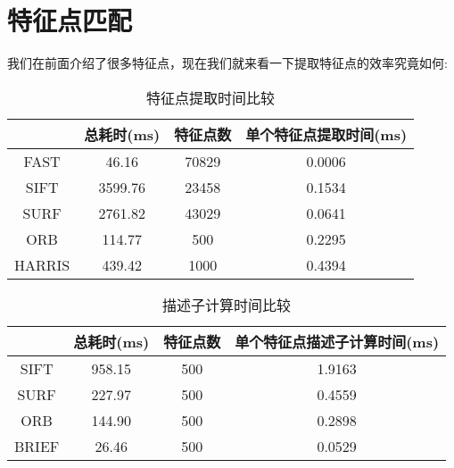 \section{特征点匹配}
我们在前面介绍了很多特征点，现在我们就来看一下提取特征点的效率究竟如何:
\begin{table}[htbp]
	\centering
	\caption{特征点提取时间比较}
	\begin{tabular}{cccc}
		\toprule
		& 总耗时(ms) & 特征点数  & 单个特征点提取时间(ms) \\ \hline
		FAST   & 46.16   & 70829 & 0.0006        \\ \hline
		SIFT   & 3599.76 & 23458 & 0.1534        \\ \hline
		SURF   & 2761.82 & 43029 & 0.0641        \\ \hline
		ORB    & 114.77  & 500   & 0.2295        \\ \hline
		HARRIS & 439.42  & 1000  & 0.4394      	\\ \bottomrule
	\end{tabular}
\end{table}\par

\begin{table}[]
	\centering
	\caption{描述子计算时间比较}
	\begin{tabular}{cccc}
		\toprule
		& 总耗时(ms) & 特征点数 & 单个特征点描述子计算时间(ms) \\ \hline
		SIFT  & 958.15  & 500  & 1.9163           \\ \hline
		SURF  & 227.97  & 500  & 0.4559           \\ \hline
		ORB   & 144.90  & 500  & 0.2898           \\ \hline
		BRIEF & 26.46   & 500  & 0.0529          \\ \bottomrule
	\end{tabular}
\end{table}




